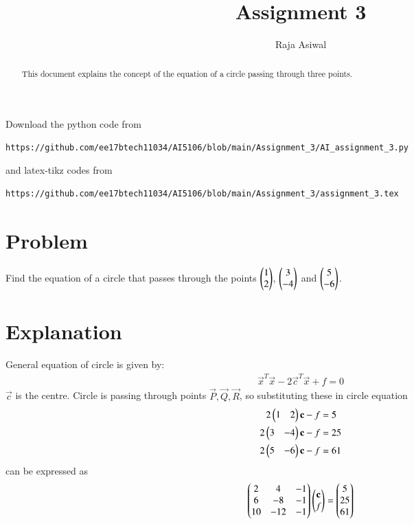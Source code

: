 \documentclass[journal,12pt,twocolumn]{IEEEtran}
\begin{document}
\renewcommand{\thefigure}{\theproblem}
\def\putbox#1#2#3{\makebox[0in][l]{\makebox[#1][l]{}\raisebox{\baselineskip}[0in][0in]{\raisebox{#2}[0in][0in]{#3}}}}
     \def\rightbox#1{\makebox[0in][r]{#1}}
     \def\centbox#1{\makebox[0in]{#1}}
     \def\topbox#1{\raisebox{-\baselineskip}[0in][0in]{#1}}
     \def\midbox#1{\raisebox{-0.5\baselineskip}[0in][0in]{#1}}
\vspace{3cm}
\title{Assignment 3}
\author{Raja Asiwal}
\maketitle
\newpage
\bigskip
\renewcommand{\thefigure}{\theenumi}
\renewcommand{\thetable}{\theenumi}
\begin{abstract}
This document explains the concept of the equation of a circle passing through three points.
\end{abstract}
Download the python code from 
%
\begin{lstlisting}
https://github.com/ee17btech11034/AI5106/blob/main/Assignment_3/AI_assignment_3.py
\end{lstlisting}
%
and latex-tikz codes from 
%
\begin{lstlisting}
https://github.com/ee17btech11034/AI5106/blob/main/Assignment_3/assignment_3.tex
\end{lstlisting}
%
\section{Problem}
\def\foo AA{$\myvec{1 \\2}$, $\myvec{3 \\-4}$ and $\myvec{5 \\ -6}$.}
Find the equation of a circle that passes through the points \foo AA


\section{Explanation}
General equation of circle is given by:\\
\begin{align}
    \vec{x}^T \vec{x} -2 \vec{c}^T \vec{x} + f = 0 
\end{align}   
$\vec{c}$ is the centre. Circle is passing through points $\vec{P}, \vec{Q}, \vec{R}$, so substituting these in circle equation
\begin{align}
    2\begin{pmatrix}1 & 2\end{pmatrix} \mathbf{c} -f &= 5 \\
    2\begin{pmatrix}3 & -4\end{pmatrix} \mathbf{c} -f &= 25 \\
    2 \begin{pmatrix}5 & -6\end{pmatrix} \mathbf{c} -f &= 61
\end{align}
can be expressed as 
\begin{align}
    \begin{pmatrix} 2 & 4 & -1 \\ 6 & -8 & -1 \\ 10 & -12 & -1 \end{pmatrix} \begin{pmatrix} \mathbf{c} \\ f \end{pmatrix} = \begin{pmatrix} 5 \\ 25 \\ 61 \end{pmatrix}
\end{align}
\end{document}
